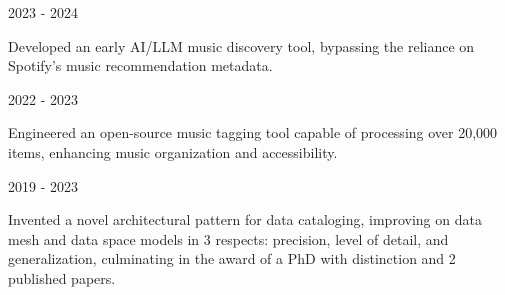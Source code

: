 

\begin{cventries}


  \cventrythin
    {} %
    {2023 - 2024} %
    {
          \begin{cvitems} %
	        \item {Developed an early AI/LLM music discovery tool, bypassing the reliance on Spotify's music recommendation metadata.}
	      \end{cvitems}
    }


  \cventrythin
    {} %
    {2022 - 2023} %
    {
          \begin{cvitems} %
	        \item {Engineered an open-source music tagging tool capable of processing over 20,000 items, enhancing music organization and accessibility.}
	      \end{cvitems}
    }




  \cventrythin
    {} %
    {2019 - 2023} %
    {
          \begin{cvitems} %
			\item {Invented a novel architectural pattern for data cataloging, improving on data mesh and data space models in 3 respects: precision, level of detail, and generalization, culminating in the award of a PhD with distinction and 2 published papers.}
	      \end{cvitems}
    }



\end{cventries}
